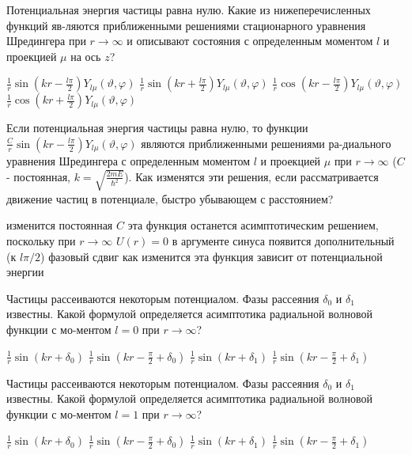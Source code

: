 \documentclass[11pt,a4paper]{exam}
\begin{document}
\begin{questions}
\question Потенциальная энергия частицы равна нулю. Какие из нижеперечисленных функций яв-ляются приближенными решениями стационарного уравнения Шредингера при $r \to \infty $ и описывают состояния с определенным моментом $l$ и проекцией $\mu $ на ось $z$?
\begin{choices}
\choice $\frac{1}{r}\sin \left( {kr - \frac{{l\pi }}{2}} \right){Y_{l\mu }}(\vartheta ,\varphi )$    
\choice $\frac{1}{r}\sin \left( {kr + \frac{{l\pi }}{2}} \right){Y_{l\mu }}(\vartheta ,\varphi )$
\choice $\frac{1}{r}\cos \left( {kr - \frac{{l\pi }}{2}} \right){Y_{l\mu }}(\vartheta ,\varphi )$    
\choice $\frac{1}{r}\cos \left( {kr + \frac{{l\pi }}{2}} \right){Y_{l\mu }}(\vartheta ,\varphi )$
\end{choices}

\question Если потенциальная энергия частицы равна нулю, то функции $\frac{C}{r}\sin \left( {kr - \frac{{l\pi }}{2}} \right){Y_{l\mu }}(\vartheta ,\varphi )$ являются приближенными решениями ра-диального уравнения Шредингера с определенным моментом $l$ и проекцией $\mu $ при $r \to \infty $ ($C$ - постоянная, $k = \sqrt {\frac{{2mE}}{{{\hbar ^2}}}} $). Как изменятся эти решения, если рассматривается движение частиц в потенциале, быстро убывающем с расстоянием?
\begin{choices}
\choice изменится постоянная $C$
\choice эта функция останется асимптотическим решением, поскольку при $r \to \infty $ $U(r) = 0$
\choice в аргументе синуса появится дополнительный (к $l\pi /2$) фазовый сдвиг
\choice как изменится эта функция зависит от потенциальной энергии
\end{choices}

\question Частицы рассеиваются некоторым потенциалом. Фазы рассеяния ${\delta _0}$ и ${\delta _1}$ известны. Какой формулой определяется асимптотика радиальной волновой функции с мо-ментом $l = 0$ при $r \to \infty $?
\begin{choices}
\choice $\frac{1}{r}\sin \left( {kr + {\delta _0}} \right)$   
\choice $\frac{1}{r}\sin \left( {kr - \frac{\pi }{2} + {\delta _0}} \right)$    
\choice $\frac{1}{r}\sin \left( {kr + {\delta _1}} \right)$   
\choice $\frac{1}{r}\sin \left( {kr - \frac{\pi }{2} + {\delta _1}} \right)$
\end{choices}

\question Частицы рассеиваются некоторым потенциалом. Фазы рассеяния ${\delta _0}$ и ${\delta _1}$ известны. Какой формулой определяется асимптотика радиальной волновой функции с мо-ментом $l = 1$ при $r \to \infty $?
\begin{choices}
\choice $\frac{1}{r}\sin \left( {kr + {\delta _0}} \right)$   
\choice $\frac{1}{r}\sin \left( {kr - \frac{\pi }{2} + {\delta _0}} \right)$    
\choice $\frac{1}{r}\sin \left( {kr + {\delta _1}} \right)$   
\choice $\frac{1}{r}\sin \left( {kr - \frac{\pi }{2} + {\delta _1}} \right)$
\end{choices}


\end{questions}
\end{document}
